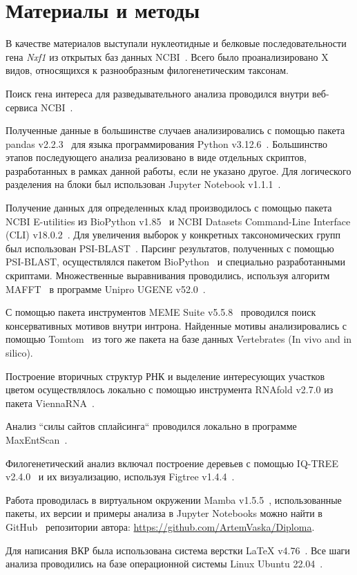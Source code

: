 \newpage
\section{Материалы и методы}

В качестве материалов выступали нуклеотидные и белковые последовательности гена \textit{Nxf1} из открытых баз данных NCBI~\cite{ncbi_general}.
Всего было проанализировано X видов, относящихся к разнообразным филогенетическим таксонам.

Поиск гена интереса для разведывательного анализа проводился внутри веб-сервиса NCBI~\cite{ncbi_general}.

Полученные данные в большинстве случаев анализировались с помощью пакета pandas v2.2.3~\cite{pandas} для языка программирования Python v3.12.6~\cite{python_3_12}.
Большинство этапов последующего анализа реализовано в виде отдельных скриптов, разработанных в рамках данной работы, если не указано другое.
Для логического разделения на блоки был использован Jupyter Notebook v1.1.1~\cite{jupyter_notebook}.

Получение данных для определенных клад производилось с помощью пакета NCBI E-utilities из BioPython v1.85~\cite{biopython} и NCBI Datasets Command-Line Interface (CLI) v18.0.2~\cite{datasets}.
Для увеличения выборок у конкретных таксономических групп был использован PSI-BLAST~\cite{psi_blast}.
Парсинг результатов, полученных с помощью PSI-BLAST, осуществлялся пакетом BioPython~\cite{biopython} и специально разработанными скриптами.
Множественные выравнивания проводились, используя алгоритм MAFFT~\cite{mafft} в программе Unipro UGENE v52.0~\cite{ugene}.

С помощью пакета инструментов MEME Suite v5.5.8~\cite{meme} проводился поиск консервативных мотивов внутри интрона.
Найденные мотивы анализировались с помощью Tomtom~\cite{tomtom} из того же пакета на базе данных Vertebrates (In vivo and in silico).

Построение вторичных структур РНК и выделение интересующих участков цветом осуществлялось локально с помощью инструмента RNAfold v2.7.0 из пакета ViennaRNA~\cite{viennarna}.

Анализ ``силы сайтов сплайсинга`` проводился локально в программе Max\-Ent\-Scan~\cite{maxentsccan}.

Филогенетический анализ включал построение деревьев с помощью IQ-TREE v2.4.0~\cite{iqtree2} и их визуализацию, используя Figtree v1.4.4~\cite{figtree}.

Работа проводилась в виртуальном окружении Mamba v1.5.5~\cite{mamba}, использованные пакеты, их версии и примеры анализа в Jupyter Notebooks можно найти в GitHub~\cite{github_general} репозитории автора: \url{https://github.com/ArtemVaska/Diploma}.

Для написания ВКР была использована система верстки LaTeX v4.76~\cite{latex}.
Все шаги анализа проводились на базе операционной системы Linux Ubuntu 22.04~\cite{ubuntu}.
